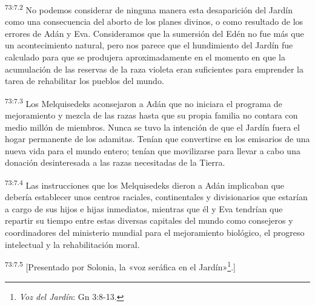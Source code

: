 \par
\textsuperscript{73:7.2} No podemos considerar de ninguna manera esta desaparición del Jardín como una consecuencia del aborto de los planes divinos, o como resultado de los errores de Adán y Eva. Consideramos que la sumersión del Edén no fue más que un acontecimiento natural, pero nos parece que el hundimiento del Jardín fue calculado para que se produjera aproximadamente en el momento en que la acumulación de las reservas de la raza violeta eran suficientes para emprender la tarea de rehabilitar los pueblos del mundo.

\par
\textsuperscript{73:7.3} Los Melquisedeks aconsejaron a Adán que no iniciara el programa de mejoramiento y mezcla de las razas hasta que su propia familia no contara con medio millón de miembros. Nunca se tuvo la intención de que el Jardín fuera el hogar permanente de los adamitas. Tenían que convertirse en los emisarios de una nueva vida para el mundo entero; tenían que movilizarse para llevar a cabo una donación desinteresada a las razas necesitadas de la Tierra.

\par
\textsuperscript{73:7.4} Las instrucciones que los Melquisedeks dieron a Adán implicaban que debería establecer unos centros raciales, continentales y divisionarios que estarían a cargo de sus hijos e hijas inmediatos, mientras que él y Eva tendrían que repartir su tiempo entre estas diversas capitales del mundo como consejeros y coordinadores del ministerio mundial para el mejoramiento biológico, el progreso intelectual y la rehabilitación moral.

\par
\textsuperscript{73:7.5} [Presentado por Solonia, la «voz seráfica en el Jardín»\footnote{\textit{Voz del Jardín}: Gn 3:8-13.}.]